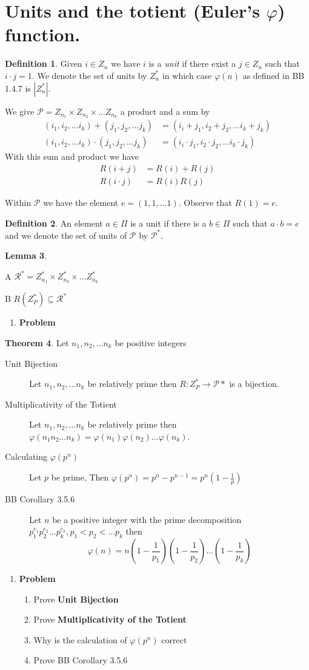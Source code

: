 \documentclass[12pt]{amsart}
\newcommand{\benu}{\begin{enumerate}}
\newcommand{\eenu}{\end{enumerate}}
\newcommand{\bed}{\begin{description}}
\newcommand{\ed}{\end{description}}
\theoremstyle{definition}
\newtheorem{theorem}{Theorem}
\newcommand{\bet}{\begin{theorem}}
\newcommand{\et}{\end{theorem}}
\newtheorem{lemma}[theorem]{Lemma}
\newcommand{\bel}{\begin{lemma}}
\newcommand{\el}{\end{lemma}}
\newtheorem{definition}[theorem]{Definition}
\newcommand{\bdf}{\begin{definition}}
\newcommand{\edf}{\end{definition}}
\newcommand{\mc}[1]{\mathcal{#1}}
\newcommand{\itep}{\item {\bfseries Problem}\ }
\begin{document}
\section{Units and the totient (Euler's $\varphi$) function.}
\bdf Given $i\in Z_n$ we have $i$ is a {\em unit} if there exist a $j\in Z_n$ such that $i\cdot j=1$. We denote the set of units by $Z_n^\ast$ in which case $\varphi(n)$ as defined in BB 1.4.7 is $|Z_n^\ast|$.
\edf

We give $\mc{P}=Z_{n_1}\times Z_{n_2}\times \dots Z_{n_k}$ a product and a sum by 
\begin{align*}
(i_1,i_2,\dots i_k)+(j_1,j_2,\dots j_k)&=(i_i+j_1,i_2+j_2,\dots i_k+j_k)\\
(i_1,i_2,\dots i_k)\cdot(j_1,j_2,\dots j_k)&=(i_i\cdot j_1,i_2\cdot j_2,\dots i_k\cdot j_k)
\end{align*}
With this sum and product we have 
\begin{align*}R(i+j)&=R(i)+R(j)\\
R(i\cdot j)&=R(i)R(j)
\end{align*}


Within $\mc{P}$ we have the element $e=(1,1,\dots 1)$. Observe that $R(1)=e$.
\bdf An element $a\in \Pi$ is a unit if there is a $b\in \Pi$ such that $a\cdot b=e$ and we denote the set of units of $\mc{P}$ by $\mc{P}^\ast$.
\edf

\bel  \label{units} \hfill
\bed

\item{A} $\mc{R}^\ast=Z_{n_1}^\ast \times Z_{n_2}^\ast\times\dots Z_{n_k}^\ast$
\item{B} $R(Z_P^\ast)\subseteq\mc{R}^\ast$

\ed
\el
\begin{enumerate}[resume=p]
\itep
\begin{comment}
\end{comment}
\end{enumerate}
\bet Let $n_1,n_2,\dots n_k$ be positive integers
\bed 
\item[Unit Bijection] Let $n_1,n_2,\dots n_k$ be relatively prime then $R\colon Z_P^*\to \mc{P}*$ is a bijection.
\item[Multiplicativity of the Totient] Let $n_1,n_2,\dots n_k$ be relatively prime then $\varphi(n_1n_2\dots n_k)=\varphi(n_1)\varphi(n_2)\dots \varphi(n_k)$.
\item[Calculating $\varphi(p^n)$] Let $p$ be prime, Then $\varphi(p^n)=p^n-p^{n-1}=p^n(1-\frac{1}{p})$
\item[BB Corollary 3.5.6] Let $n$ be a positive integer with the prime decomposition $p_1^{e_1}p_2^{e_2}\dots p_k^{e_k},p_1<p_2<\dots p_k$ then
\[
\varphi(n)=n(1-\frac{1}{p_1})(1-\frac{1}{p_2})\dots(1-\frac{1}{p_k})
\]
\ed
\et
\begin{enumerate}[resume=p]
\itep
\benu
\item
 Prove {\bfseries Unit Bijection}
\item Prove {\bfseries Multiplicativity of the Totient}
 \item Why is the calculation of $\varphi(p^n)$ correct
 \item Prove BB Corollary 3.5.6

\eenu
\end{enumerate}
\end{document}
